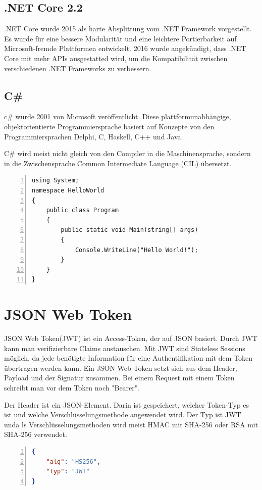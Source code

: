 \subsection{.NET Core 2.2}
.NET Core wurde 2015 als harte Absplittung vom .NET Framework vorgestellt. Es wurde für eine bessere Modularität und eine leichtere Portierbarkeit auf Microsoft-fremde Plattformen entwickelt. 2016 wurde angekündigt, dass .NET Core mit mehr APIs ausgestatted wird, um die Kompatibilität zwischen verschiedenen .NET Frameworks zu verbessern. \autocite{wikiDotnet}

\subsection{C\#}
c\# wurde 2001 von Microsoft veröffentlicht. Diese plattformunabhängige, objektorientierte Programmiersprache basiert auf Konzepte von den Programmiersprachen Delphi, C, Haskell, C++ und Java.

C\# wird meist nicht gleich von den Compiler in die Maschinensprache, sondern in die Zwischensprache Common Intermediate Language (CIL) übersetzt. \autocite{wikiCSharp}

\begin{lstlisting}[caption={C\#-Syntaxbeispiel},captionpos=b, numbers=left, backgroundcolor=\color{black!10}, language={[Sharp]C}]
using System;
namespace HelloWorld
{
	public class Program
	{
		public static void Main(string[] args)
		{
			Console.WriteLine("Hello World!");
		}
	}
}
\end{lstlisting}

\section{JSON Web Token}
JSON Web Token(JWT) ist ein Access-Token, der auf JSON basiert. Durch JWT kann man verifizierbare Claims austauschen. Mit JWT sind Stateless Sessions möglich, da jede benötigte Information für eine Authentifikation mit dem Token übertragen werden kann. Ein JSON Web Token setzt sich aus dem Header, Payload und der Signatur zusammen. Bei einem Request mit einem Token schreibt man vor dem Token noch "Bearer".

Der Header ist ein JSON-Element. Darin ist gespeichert, welcher Token-Typ es ist und welche Verschlüsselungsmethode angewendet wird. Der Typ ist JWT unda ls Verschlüsselungsmethoden wird meist HMAC mit SHA-256 oder RSA mit SHA-256 verwendet.\\
\begin{lstlisting}[caption={JWT-Header Beispiel},captionpos=b, numbers=left, backgroundcolor=\color{black!10}, language=json]
{
	"alg": "HS256",
	"typ": "JWT"
}
\end{lstlisting}

